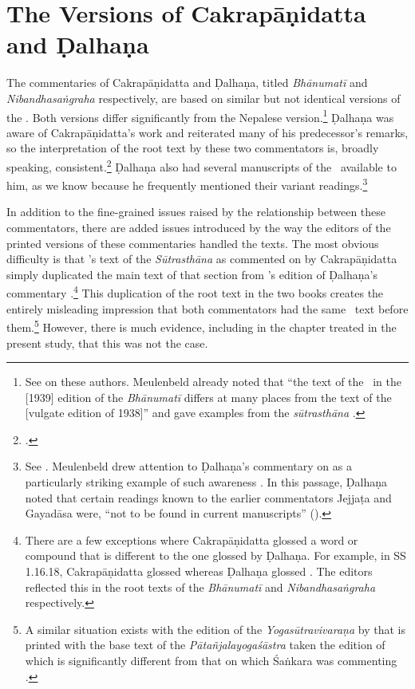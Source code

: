 \section{The Versions of Cakrapāṇidatta and Ḍalhaṇa}

The commentaries of Cakrapāṇidatta and Ḍalhaṇa, titled \emph{Bhānumatī} and
\emph{Nibandhasaṅgraha} respectively, are based on similar but not identical
versions of the \SS.  Both versions differ significantly from the Nepalese
version.\footnote{See \cite[IA 374--379]{meul-hist} on these authors. Meulenbeld
already noted that “the text of the \SS\ in the [1939] edition of the
\emph{Bhānumatī} differs at many places from the text of the [vulgate edition of
1938]” and gave examples from the \emph{sūtrasthāna} \citep[IB, 496, note
76]{meul-hist}.} Ḍalhaṇa was aware of Cakrapāṇidatta's work and reiterated many of
his predecessor's remarks, so the interpretation of the root text by these two
commentators is, broadly speaking, consistent.\footcite[IB, 499,
n.\,162]{meul-hist}  Ḍalhaṇa also had several manuscripts of the \SS\
available to him, as we know because he frequently mentioned their variant
readings.\footnote{See \cite[IA, 377]{meul-hist}.  Meulenbeld drew attention to
Ḍalhaṇa's commentary on \Su{5.8.24cd--25ab}{587} as a particularly striking
example of such awareness \citep[IB, 497, n.\,112]{meul-hist}.  In this passage, Ḍalhaṇa
noted that certain readings known to the earlier commentators Jejjaṭa and Gayadāsa
were, “not to be found in current manuscripts” 
().}

In addition to the fine-grained issues raised by the relationship between these
commentators, there are added issues introduced by the way the editors of the
printed versions of these commentaries handled the texts. The most obvious
difficulty is that \citeauthor{acar-1939}'s text of the \emph{Sūtrasthāna} as
commented on by Cakrapāṇidatta \citep{acar-1939} simply duplicated the main text
of that section from \citeauthor{vulgate}'s edition of Ḍalhaṇa's commentary
\citep{vulgate}.\footnote{There are a few exceptions where Cakrapāṇidatta glossed
    a word or compound that is different to the one glossed by Ḍalhaṇa. For example,
    in SS 1.16.18, Cakrapāṇidatta glossed \dev{rājasarṣapa} whereas Ḍalhaṇa glossed
    \dev{gaurasarṣapa}.  The editors reflected this in the root texts of the
    \emph{Bhānumatī} \citep[130]{acar-1939} and \emph{Nibandhasaṅgraha}
    \citep[79]{vulgate} respectively.} This duplication of the root text in the two
    books creates the entirely misleading impression that both commentators had the
    same \SS\ text before them.\footnote{A similar situation exists with the edition
        of the \emph{Yogasūtravivaraṇa} by \citet{rama-1952} that is printed with the base
        text of the \emph{Pātañjalayogaśāstra} taken the edition of \citet{agas-1904}
        which is significantly different from that on which Śaṅkara was commenting
        \citep[77--78]{maas-2013}.} However, there is much evidence, including in the
        chapter treated in the present study, that this was not the case. 
        
